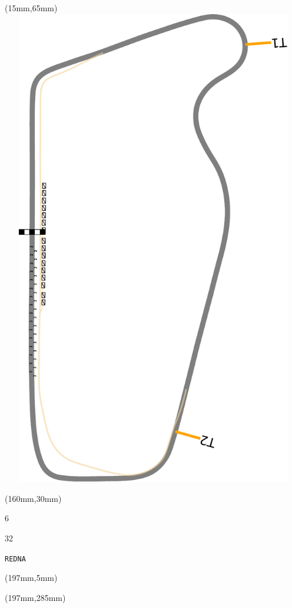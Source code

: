 \begin{textblock*}{185mm}(15mm,65mm)%
\centering
\mbox{\includegraphics[width=185mm,height=210mm,keepaspectratio]{PT/REDNA.pdf}}
\end{textblock*}
\begin{textblock*}{40mm}(160mm,30mm)%
\Large
\par{} 
\par6 
\par32 
\par\hfill\tiny\tt REDNA\\
\end{textblock*}
\begin{textblock*}{20mm}(197mm,5mm)%
\fbox{\thepage}
\label{REDNA}
\end{textblock*}
\begin{textblock*}{20mm}(197mm,285mm)%
\fbox{\thepage}
\end{textblock*}

